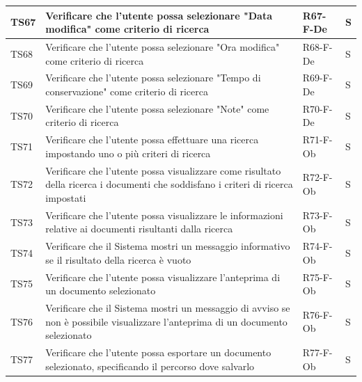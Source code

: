 \documentclass[a4paper,12pt]{article}
\begin{document}
\begin{longtable}{|M{1.2cm}|M{6.3cm}|M{2.5cm}|M{1.5cm}|}
                TS67 & Verificare che l'utente possa selezionare "Data modifica" come criterio di ricerca & R67-F-De & S \\
                \hline

                TS68 & Verificare che l'utente possa selezionare "Ora modifica" come criterio di ricerca & R68-F-De & S \\
                \hline

                TS69 & Verificare che l'utente possa selezionare "Tempo di conservazione" come criterio di ricerca & R69-F-De & S \\
                \hline

                TS70 & Verificare che l'utente possa selezionare "Note" come criterio di ricerca & R70-F-De & S \\
                \hline

                TS71 & Verificare che l'utente possa effettuare una ricerca impostando uno o più criteri di ricerca & R71-F-Ob & S \\
                \hline

                TS72 & Verificare che l'utente possa visualizzare come risultato della ricerca i documenti che soddisfano i criteri di ricerca impostati & R72-F-Ob & S \\
                \hline

                TS73 & Verificare che l'utente possa visualizzare le informazioni relative ai documenti risultanti dalla ricerca & R73-F-Ob & S \\
                \hline

                TS74 & Verificare che il Sistema mostri un messaggio informativo se il risultato della ricerca è vuoto & R74-F-Ob & S \\
                \hline

                TS75 & Verificare che l'utente possa visualizzare l'anteprima di un documento selezionato & R75-F-Ob & S \\
                \hline

                TS76 & Verificare che il Sistema mostri un messaggio di avviso se non è possibile visualizzare l'anteprima di un documento selezionato & R76-F-Ob & S \\
                \hline

                TS77 & Verificare che l'utente possa esportare un documento selezionato, specificando il percorso dove salvarlo & R77-F-Ob & S \\
                \hline


\end{longtable}
\end{document}
